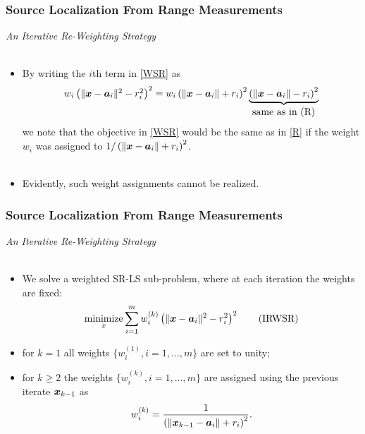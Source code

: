 \documentclass [t] {beamer} %
\begin{document}
\begin{frame} %
\frametitle{Source Localization From Range Measurements}
{\large \textit{An Iterative Re-Weighting Strategy}} \\~\\
\normalsize
\begin{itemize}
\item 
By writing the $i$th term in \eqref{WSR} as
\begin{equation}
\nonumber
\begin{array}{l}
w_i\left(\|\mbox{\boldmath$x$}-\mbox{\boldmath$a$}_i\|^2-r_i^2\right)^2 = w_i\left(\|\mbox{\boldmath$x$}-\mbox{\boldmath$a$}_i\|+r_i\right)^2 \underbrace{\left(\|\mbox{\boldmath$x$}-\mbox{\boldmath$a$}_i\|-r_i\right)^2}_{\mbox{same as in (R)}}
\end{array}
\end{equation}
we note that the objective in \eqref{WSR} would be the same as in \eqref{R} if the weight $w_i$ was assigned to $1/\left(\|\mbox{\boldmath$x$}-\mbox{\boldmath$a$}_i\|+r_i\right)^2$. \\~\\
\item 
Evidently, such weight assignments cannot be realized.
\end{itemize}
\end{frame}


\begin{frame}%
\frametitle{Source Localization From Range Measurements}
{\large \textit{An Iterative Re-Weighting Strategy}} 
\\~\\
\normalsize

\begin{itemize}
\item 
 We solve a weighted SR-LS sub-problem, where at each iteration the weights are fixed:
\begin{equation} \label{IRWSR}
\mathop{\mbox{minimize}}_{x} \sum_{i=1}^m w_i^{(k)}\left(\|\mbox{\boldmath$x$}-\mbox{\boldmath$a$}_i\|^2-r_i^2\right)^2 \tag{IRWSR}
\end{equation}
\item 
 for $k=1$ all weights $\{w_i^{(1)}, i=1,\ldots, m\}$ are set to unity; \\
 \item 
 for $k\geq2$ the weights $\{w_i^{(k)},i=1,\ldots,m\}$ are assigned using the previous iterate $\mbox{\boldmath$x$}_{k-1}$ as
\begin{equation} 
\nonumber
w_i^{(k)}=\frac{1}{\left(\|\mbox{\boldmath$x$}_{k-1}-\mbox{\boldmath$a$}_i\|+r_i\right)^2}.
\end{equation}

\end{itemize}
\end{frame}
\end{document}
